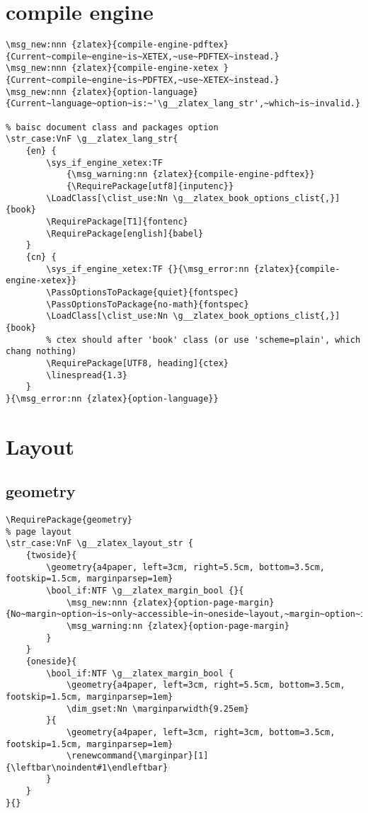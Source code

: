 \section{compile engine}
\begin{verbatim}
\msg_new:nnn {zlatex}{compile-engine-pdftex}{Current~compile~engine~is~XETEX,~use~PDFTEX~instead.}
\msg_new:nnn {zlatex}{compile-engine-xetex }{Current~compile~engine~is~PDFTEX,~use~XETEX~instead.}
\msg_new:nnn {zlatex}{option-language}{Current~language~option~is:~'\g__zlatex_lang_str',~which~is~invalid.}

% baisc document class and packages option
\str_case:VnF \g__zlatex_lang_str{
    {en} { 
        \sys_if_engine_xetex:TF 
            {\msg_warning:nn {zlatex}{compile-engine-pdftex}}
            {\RequirePackage[utf8]{inputenc}}
        \LoadClass[\clist_use:Nn \g__zlatex_book_options_clist{,}]{book} 
        \RequirePackage[T1]{fontenc}
        \RequirePackage[english]{babel} 
    }
    {cn} {
        \sys_if_engine_xetex:TF {}{\msg_error:nn {zlatex}{compile-engine-xetex}}
        \PassOptionsToPackage{quiet}{fontspec}
        \PassOptionsToPackage{no-math}{fontspec}
        \LoadClass[\clist_use:Nn \g__zlatex_book_options_clist{,}]{book}
        % ctex should after 'book' class (or use 'scheme=plain', which chang nothing)
        \RequirePackage[UTF8, heading]{ctex}
        \linespread{1.3}
    }
}{\msg_error:nn {zlatex}{option-language}}  
\end{verbatim}

\section{Layout}
\subsection{geometry}
\begin{verbatim}
\RequirePackage{geometry}
% page layout 
\str_case:VnF \g__zlatex_layout_str {
    {twoside}{
        \geometry{a4paper, left=3cm, right=5.5cm, bottom=3.5cm, footskip=1.5cm, marginparsep=1em}
        \bool_if:NTF \g__zlatex_margin_bool {}{
            \msg_new:nnn {zlatex}{option-page-margin}{No~margin~option~is~only~accessible~in~oneside~layout,~margin~option~is~now~enabled~by~default.} 
            \msg_warning:nn {zlatex}{option-page-margin}
        }
    }
    {oneside}{
        \bool_if:NTF \g__zlatex_margin_bool {
            \geometry{a4paper, left=3cm, right=5.5cm, bottom=3.5cm, footskip=1.5cm, marginparsep=1em}
            \dim_gset:Nn \marginparwidth{9.25em}
        }{
            \geometry{a4paper, left=3cm, right=3cm, bottom=3.5cm, footskip=1.5cm, marginparsep=1em}
            \renewcommand{\marginpar}[1]{\leftbar\noindent#1\endleftbar}
        }
    }
}{}
\end{verbatim}

